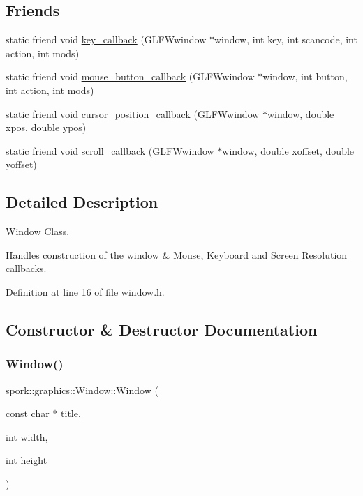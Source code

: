 \subsection*{Friends}
\begin{DoxyCompactItemize}
\item 
static friend void \hyperlink{classspork_1_1graphics_1_1_window_a5d0f196b2f1443f793ef20de522995a3}{key\+\_\+callback} (G\+L\+F\+Wwindow $\ast$window, int key, int scancode, int action, int mods)
\item 
static friend void \hyperlink{classspork_1_1graphics_1_1_window_a934c179d0911e7f70088cebec526bfb6}{mouse\+\_\+button\+\_\+callback} (G\+L\+F\+Wwindow $\ast$window, int button, int action, int mods)
\item 
static friend void \hyperlink{classspork_1_1graphics_1_1_window_abd0dee5e80d63ce619c6681efb034852}{cursor\+\_\+position\+\_\+callback} (G\+L\+F\+Wwindow $\ast$window, double xpos, double ypos)
\item 
static friend void \hyperlink{classspork_1_1graphics_1_1_window_af7cf061faac82731cc1ac5dace7b42c1}{scroll\+\_\+callback} (G\+L\+F\+Wwindow $\ast$window, double xoffset, double yoffset)
\end{DoxyCompactItemize}


\subsection{Detailed Description}
\hyperlink{classspork_1_1graphics_1_1_window}{Window} Class. 

Handles construction of the window \& Mouse, Keyboard and Screen Resolution callbacks. 

Definition at line 16 of file window.\+h.



\subsection{Constructor \& Destructor Documentation}
\mbox{\label{classspork_1_1graphics_1_1_window_a61957a15dbf07c17924f2da018ff478c}} 
\subsubsection{\texorpdfstring{Window()}{Window()}}
{\footnotesize\ttfamily spork\+::graphics\+::\+Window\+::\+Window (\begin{DoxyParamCaption}\item[{const char $\ast$}]{title,  }\item[{int}]{width,  }\item[{int}]{height }\end{DoxyParamCaption})}



